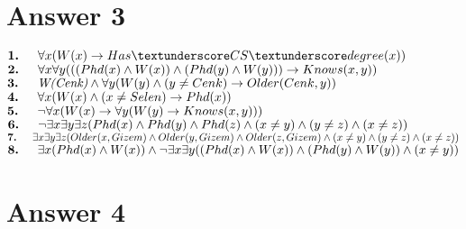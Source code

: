 \documentclass[12pt]{article}
\begin{document}
\section*{Answer 3}
$\textbf{1.} \hspace{15px} \forall x (W(x) \rightarrow{Has \textunderscore CS \textunderscore degree(x)}) $ \bigskip \\ 
$\textbf{2.} \hspace{15px} \forall x \forall y (((Phd(x) \wedge W(x))\wedge(Phd(y) \wedge W(y))) \rightarrow Knows(x,y)) $ \bigskip \\
$\textbf{3.} \hspace{15px} \textit{W(Cenk)} \wedge \forall y (W(y) \wedge (y \neq Cenk) \rightarrow Older(Cenk,y)) $ \bigskip \\
$\textbf{4.} \hspace{15px} \forall x (W(x) \wedge (x \neq Selen) \rightarrow Phd(x)) $ \bigskip \\
$\textbf{5.} \hspace{15px} \neg \forall x(W(x) \rightarrow \forall y (W(y) \rightarrow Knows(x,y))) $ \bigskip \\
$\textbf{6.} \hspace{15px} \neg \exists x \exists y \exists z (Phd(x) \wedge Phd(y) \wedge Phd(z) \wedge (x\neq y) \wedge (y\neq z) \wedge (x\neq z)) $ \bigskip \\
$\textbf{7.} \hspace{15px} \exists x \exists y \exists z (Older(x,Gizem) \wedge Older(y,Gizem) \wedge Older(z,Gizem) \wedge (x\neq y) \wedge (y\neq z) \wedge (x\neq z))$ \bigskip \\
$\textbf{8.} \hspace{15px} \exists x (Phd(x) \wedge W(x)) \wedge \neg \exists x \exists y ((Phd(x) \wedge W(x)) \wedge (Phd(y) \wedge W(y)) \wedge (x\neq y) ) $ \bigskip \\
\section*{Answer 4}
\end{document}
